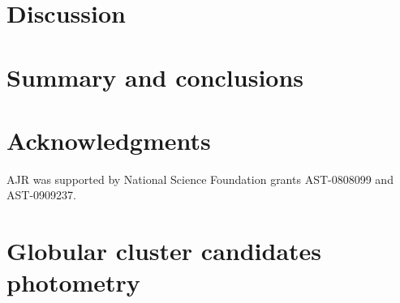 \documentclass[useAMS,usenatbib]{mn2e}
\begin{document}
\lipsum[1-2]

\section{Discussion}
\label{sec:discussion}

\lipsum[1-2]

\section{Summary and conclusions}
\label{sec:conclusions}

\lipsum[1-2]

\section*{Acknowledgments}

AJR was supported by National Science Foundation grants AST-0808099
and AST-0909237.




\appendix
\onecolumn
\section{Globular cluster candidates photometry}
\label{sec:appendix}



\lipsum[1]
\end{document}
